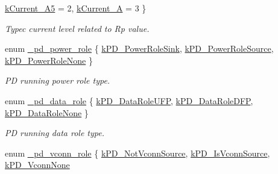 \begin{DoxyCompactItemize}
\hyperlink{group__usb__pd__stack_ggaf956bb4d3d27df52fb694311b8219b0ead84bbcae527b6cfc2e9a5fd96648af74}{k\-Current\-\_\-A5} = 2, 
\hyperlink{group__usb__pd__stack_ggaf956bb4d3d27df52fb694311b8219b0ead97ab9ef94b70e7dfca45f9aa0883299}{k\-Current\-\_\-A} = 3
 \}
\begin{DoxyCompactList}\small\item\em Typec current level related to Rp value. \end{DoxyCompactList}\item 
enum \hyperlink{group__usb__pd__stack_ga46146487374ddc31d48f33b2b6a26f8b}{\-\_\-pd\-\_\-power\-\_\-role} \{ \hyperlink{group__usb__pd__stack_gga46146487374ddc31d48f33b2b6a26f8bafca465150c227ef579c7a2bfc47b4072}{k\-P\-D\-\_\-\-Power\-Role\-Sink}, 
\hyperlink{group__usb__pd__stack_gga46146487374ddc31d48f33b2b6a26f8ba9fdae65ce89c7d877981a3abef33a2cb}{k\-P\-D\-\_\-\-Power\-Role\-Source}, 
\hyperlink{group__usb__pd__stack_gga46146487374ddc31d48f33b2b6a26f8bae0c041be8e861b6b6e95444d9b83c99f}{k\-P\-D\-\_\-\-Power\-Role\-None}
 \}
\begin{DoxyCompactList}\small\item\em P\-D running power role type. \end{DoxyCompactList}\item 
enum \hyperlink{group__usb__pd__stack_ga25760887aa95821023cc0ab5e151f828}{\-\_\-pd\-\_\-data\-\_\-role} \{ \hyperlink{group__usb__pd__stack_gga25760887aa95821023cc0ab5e151f828a20fd8fe92eea59b9fd7dd0691e395baa}{k\-P\-D\-\_\-\-Data\-Role\-U\-F\-P}, 
\hyperlink{group__usb__pd__stack_gga25760887aa95821023cc0ab5e151f828ad5849c6d513a7161652bf49bf5096e61}{k\-P\-D\-\_\-\-Data\-Role\-D\-F\-P}, 
\hyperlink{group__usb__pd__stack_gga25760887aa95821023cc0ab5e151f828add847c28e7ba864fb234a45b4ec1a186}{k\-P\-D\-\_\-\-Data\-Role\-None}
 \}
\begin{DoxyCompactList}\small\item\em P\-D running data role type. \end{DoxyCompactList}\item 
enum \hyperlink{group__usb__pd__stack_gab67908aebf6cb10704f4ec6127761e28}{\-\_\-pd\-\_\-vconn\-\_\-role} \{ \hyperlink{group__usb__pd__stack_ggab67908aebf6cb10704f4ec6127761e28ad27a489c262689fb72562c3a59cb9727}{k\-P\-D\-\_\-\-Not\-Vconn\-Source}, 
\hyperlink{group__usb__pd__stack_ggab67908aebf6cb10704f4ec6127761e28a239cd9fcbe39abba0bc8959dc1a24e37}{k\-P\-D\-\_\-\-Is\-Vconn\-Source}, 
\hyperlink{group__usb__pd__stack_ggab67908aebf6cb10704f4ec6127761e28ae0360c02ff4cf3244238399eab41ff6d}{k\-P\-D\-\_\-\-Vconn\-None}

\end{DoxyCompactItemize}
